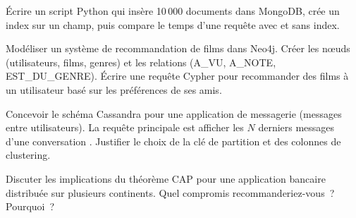 \begin{exercice}
\'Ecrire un script Python qui ins\`ere 10\,000 documents dans MongoDB,
cr\'ee un index sur un champ, puis compare le temps d'une requ\^ete avec
et sans index.
\end{exercice}

\begin{exercice}
Mod\'eliser un syst\`eme de recommandation de films dans Neo4j. Cr\'eer
les n\oe uds (utilisateurs, films, genres) et les relations (A\_VU,
A\_NOTE, EST\_DU\_GENRE). \'Ecrire une requ\^ete Cypher pour recommander
des films \`a un utilisateur bas\'e sur les pr\'ef\'erences de ses amis.
\end{exercice}

\begin{exercice}
Concevoir le sch\'ema Cassandra pour une application de messagerie
(messages entre utilisateurs). La requ\^ete principale est \og afficher
les $N$ derniers messages d'une conversation \fg. Justifier le choix
de la cl\'e de partition et des colonnes de clustering.
\end{exercice}

\begin{exercice}
Discuter les implications du th\'eor\`eme CAP pour une application
bancaire distribu\'ee sur plusieurs continents. Quel compromis
recommanderiez-vous~? Pourquoi~?
\end{exercice}
